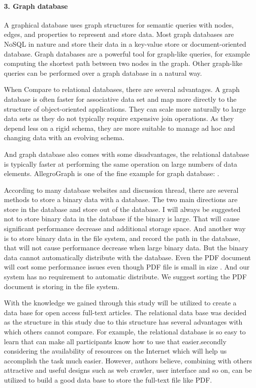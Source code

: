 \paragraph{3. Graph database}
A graphical database uses graph structures for semantic queries with nodes,  edges, and properties to represent and store data. Most graph databases are NoSQL in nature and store their data in a key-value store or document-oriented database. Graph databases are a powerful tool for graph-like queries, for example computing the shortest path between two nodes in the graph. Other graph-like queries can be performed over a graph database in a natural way.

When Compare to relational databases, there are several advantages. A graph database is often faster for associative data set and map more directly to the structure of object-oriented applications. They can scale more naturally to large data sets as they do not typically require expensive join operations. As they depend less on a rigid schema, they are more suitable to manage ad hoc and changing data with an evolving schema.

And graph database also comes with some disadvantages, the relational database is typically faster at performing the same operation on large numbers of data elements. AllegroGraph is one of the fine example for graph database: . 


According to many database websites and discussion thread, there are several methods to store a binary data with a database. The two main directions are store in the database and store out of the database. I will always be suggested not to store binary data in the database if the binary is large. That will cause significant performance decrease and additional storage space. And another way is to store binary data in the file system, and record the path in the database, that will not cause performance decrease when large binary data. But the binary data cannot automatically distribute with the database. Even the PDF document will cost some performance issues even though PDF file is small in size . And our system has no requirement to automatic distribute.  We suggest sorting  the PDF document is storing in the file system.

With the knowledge we gained  through this study will be utilized  to create a data base for open access full-text articles. The relational data base was decided as the structure in this study due to this structure has several advantages with which others cannot compare. For example, the relational database is so easy to learn that can make all participants know how to use that easier.secondly considering the availability of resources on the Internet which will help us accomplish the task much easier. However, authors believe, combining with others attractive and useful designs such as web crawler, user interface and so on, can be utilized to build a good data base  to  store the full-text file like PDF.\\\\\\

